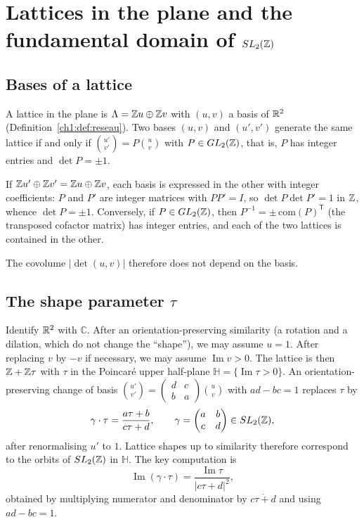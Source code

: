 \section{Lattices in the plane and the fundamental domain of \texorpdfstring{$SL_2(\mathbb{Z})$}{SL2(Z)}}\label{appA:sec:sl2}

\subsection{Bases of a lattice}
A lattice in the plane is $\Lambda=\mathbb{Z} u\oplus\mathbb{Z} v$ with $(u,v)$ a basis of $\mathbb{R}^2$ (Definition~\ref{ch1:def:reseau}). Two
bases $(u,v)$ and $(u',v')$ generate the same lattice if and only if $\binom{u'}{v'}=P\binom uv$ with $P\in GL_2(\mathbb{Z})$,
that is, $P$ has integer entries and $\det P=\pm1$.

\begin{humanproof}
If $\mathbb{Z} u'\oplus\mathbb{Z} v'=\mathbb{Z} u\oplus\mathbb{Z} v$, each basis is expressed in the other with integer coefficients: $P$ and $P'$
are integer matrices with $PP'=I$, so $\det P\det P'=1$ in $\mathbb{Z}$, whence $\det P=\pm1$. Conversely, if $P\in GL_2(\mathbb{Z})$,
then $P^{-1}=\pm\,\mathrm{com}(P)^{\mathsf T}$ (the transposed cofactor matrix) has integer entries, and each of the
two lattices is contained in the other.
\end{humanproof}
The covolume $|\det(u,v)|$ therefore does not depend on the basis.

\subsection{The shape parameter \texorpdfstring{$\tau$}{tau}}
Identify $\mathbb{R}^2$ with $\mathbb{C}$. After an orientation-preserving similarity (a rotation and a dilation, which do not
change the ``shape''), we may assume $u=1$. After replacing $v$ by $-v$ if necessary, we may assume $\operatorname{Im}v>0$.
The lattice is then $\mathbb{Z}+\mathbb{Z}\tau$ with $\tau$ in the Poincaré upper half-plane $\mathbb H=\{\operatorname{Im}\tau>0\}$.
An orientation-preserving change of basis $\binom{u'}{v'}=\begin{pmatrix}d&c\\b&a\end{pmatrix}\binom uv$ with $ad-bc=1$
replaces $\tau$ by
\[\gamma\cdot\tau=\frac{a\tau+b}{c\tau+d},\qquad\gamma=\begin{pmatrix}a&b\\c&d\end{pmatrix}\in SL_2(\mathbb{Z}),\]
after renormalising $u'$ to $1$. Lattice shapes up to similarity therefore correspond to the orbits of
$SL_2(\mathbb{Z})$ in $\mathbb H$. The key computation is
\begin{equation}\label{appA:eq:im}
\operatorname{Im}(\gamma\cdot\tau)=\frac{\operatorname{Im}\tau}{|c\tau+d|^2},
\end{equation}
obtained by multiplying numerator and denominator by $\overline{c\tau+d}$ and using $ad-bc=1$.

